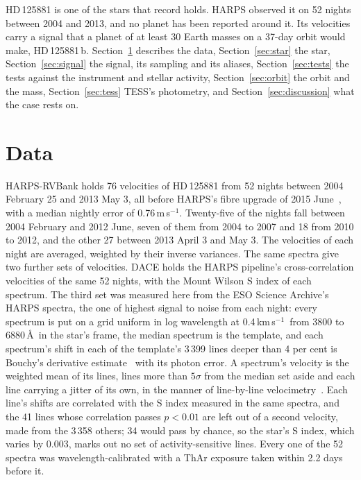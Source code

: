 \documentclass[3p,11pt]{elsarticle}
\newcommand{\kms}{km\,s$^{-1}$}
\newcommand{\ms}{m\,s$^{-1}$}
\begin{document}
HD\,125881 is one of the stars that record holds. HARPS observed it on 52 nights between 2004 and
2013, and no planet has been reported around it. Its velocities carry a signal that a planet of at
least 30 Earth masses on a 37-day orbit would make, HD\,125881\,b. Section~\ref{sec:data} describes the
data, Section~\ref{sec:star} the star, Section~\ref{sec:signal} the signal, its sampling and its
aliases, Section~\ref{sec:tests} the tests against the instrument and stellar activity,
Section~\ref{sec:orbit} the orbit and the mass, Section~\ref{sec:tess} TESS's photometry, and
Section~\ref{sec:discussion} what the case rests on.

\section{Data}\label{sec:data}

HARPS-RVBank holds 76 velocities of HD\,125881 from 52 nights between 2004 February 25 and 2013 May 3,
all before HARPS's fibre upgrade of 2015 June~\cite{LoCurto2015}, with a median nightly error of
0.76\,\ms. Twenty-five of the nights fall between 2004 February and 2012 June, seven of them from 2004
to 2007 and 18 from 2010 to 2012, and the other 27 between 2013 April 3 and May 3. The velocities of
each night are averaged, weighted by their inverse variances. The same spectra give two further sets
of velocities. DACE holds the HARPS pipeline's cross-correlation velocities of the same 52 nights, with
the Mount Wilson S index of each spectrum. The third set was measured here from the ESO Science
Archive's HARPS spectra, the one of highest signal to noise from each night: every spectrum is put on a
grid uniform in log wavelength at 0.4\,\kms\ from 3800 to 6880\,\AA\ in the star's frame, the median
spectrum is the template, and each spectrum's shift in each of the template's 3\,399 lines deeper than
4 per cent is Bouchy's derivative estimate~\cite{Bouchy2001} with its photon error. A spectrum's
velocity is the weighted mean of its lines, lines more than $5\sigma$ from the median set aside and each
line carrying a jitter of its own, in the manner of line-by-line velocimetry~\cite{Artigau2022}. Each
line's shifts are correlated with the S index measured in the same spectra, and the 41 lines whose
correlation passes $p < 0.01$ are left out of a second velocity, made from the 3\,358 others; 34 would
pass by chance, so the star's S index, which varies by 0.003, marks out no set of activity-sensitive
lines. Every
one of the 52 spectra was wavelength-calibrated with a ThAr exposure taken within 2.2 days before it.
\end{document}
